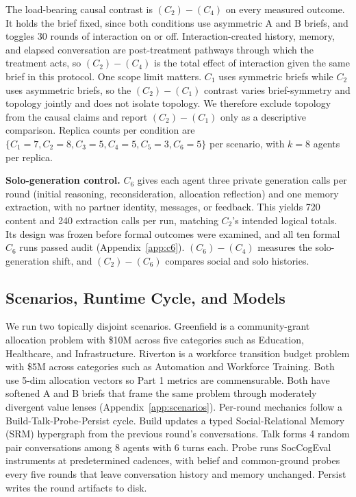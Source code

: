 The load-bearing causal contrast is $(C_2){-}(C_4)$ on every measured outcome. It holds the brief fixed, since both conditions use asymmetric A and B briefs, and toggles 30 rounds of interaction on or off. Interaction-created history, memory, and elapsed conversation are post-treatment pathways through which the treatment acts, so $(C_2){-}(C_4)$ is the total effect of interaction given the same brief in this protocol. One scope limit matters. $C_1$ uses symmetric briefs while $C_2$ uses asymmetric briefs, so the $(C_2){-}(C_1)$ contrast varies brief-symmetry and topology jointly and does not isolate topology. We therefore exclude topology from the causal claims and report $(C_2){-}(C_1)$ only as a descriptive comparison. Replica counts per condition are $\{C_1{=}7, C_2{=}8, C_3{=}5, C_4{=}5, C_5{=}3, C_6{=}5\}$ per scenario, with $k{=}8$ agents per replica.

\textbf{Solo-generation control.} $C_6$ gives each agent three private generation calls per round (initial reasoning, reconsideration, allocation reflection) and one memory extraction, with no partner identity, messages, or feedback. This yields 720 content and 240 extraction calls per run, matching $C_2$'s intended logical totals. Its design was frozen before formal outcomes were examined, and all ten formal $C_6$ runs passed audit (Appendix~\ref{app:c6}). $(C_6){-}(C_4)$ measures the solo-generation shift, and $(C_2){-}(C_6)$ compares social and solo histories.

\subsection{Scenarios, Runtime Cycle, and Models}\label{sec:fsip-cycle}

We run two topically disjoint scenarios. Greenfield is a community-grant allocation problem with \$10M across five categories such as Education, Healthcare, and Infrastructure. Riverton is a workforce transition budget problem with \$5M across categories such as Automation and Workforce Training. Both use 5-dim allocation vectors so Part 1 metrics are commensurable. Both have softened A and B briefs that frame the same problem through moderately divergent value lenses (Appendix~\ref{app:scenarios}). Per-round mechanics follow a Build-Talk-Probe-Persist cycle. Build updates a typed Social-Relational Memory (SRM) hypergraph from the previous round's conversations. Talk forms 4 random pair conversations among 8 agents with 6 turns each. Probe runs SocCogEval instruments at predetermined cadences, with belief and common-ground probes every five rounds that leave conversation history and memory unchanged. Persist writes the round artifacts to disk.

